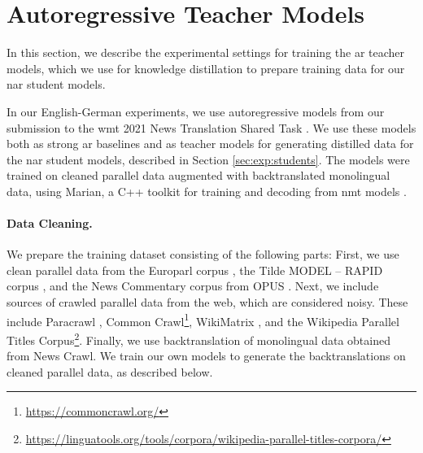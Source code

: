 \section{Autoregressive Teacher Models}%
\label{sec:exp:teachers}


\noindent
In this section, we describe the experimental settings for training the \ac{ar}
teacher models, which we use for knowledge distillation to prepare training
data for our \ac{nar} student models.

In our English-German experiments, we use autoregressive models from our
submission to the \ac{wmt} 2021 News Translation Shared Task
\citep{chen-etal-2021-university}. We use these models both as strong \ac{ar}
baselines and as teacher models for generating distilled data for the \ac{nar}
student models, described in Section \ref{sec:exp:students}. The models were
trained on cleaned parallel data augmented with backtranslated monolingual
data, using Marian, a C++ toolkit for training and decoding from \ac{nmt}
models \citep{junczys-dowmunt-etal-2018-marian}.

\paragraph{Data Cleaning.} We prepare the training dataset consisting of the
following parts: First, we use clean parallel data from the Europarl corpus
\citep{koehn-2005-europarl}, the Tilde MODEL -- RAPID corpus
\citep{rozis-skadins-2017-tilde}, and the News Commentary corpus from OPUS
\citep{tiedemann-2012-parallel}. Next, we include sources of crawled parallel
data from the web, which are considered noisy. These include Paracrawl
\citep{espla-etal-2019-paracrawl}, Common
Crawl\footnote{\url{https://commoncrawl.org/}}, WikiMatrix
\citep{schwenk2019wikimatrix}, and the Wikipedia Parallel Titles
Corpus\footnote{\url{https://linguatools.org/tools/corpora/wikipedia-parallel-titles-corpora/}}. Finally,
we use backtranslation \citep{sennrich-etal-2016-improving} of monolingual data
obtained from News Crawl.  We train our own models to generate the
backtranslations on cleaned parallel data, as described below.

